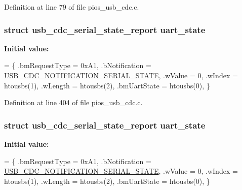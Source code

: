 Definition at line 79 of file pios\-\_\-usb\-\_\-cdc.\-c.

\hypertarget{group___p_i_o_s___u_s_b___c_o_m_gaf7f356f1ada9744b2424b2980baa2a81}{
\subsubsection[{uart\-\_\-state}]{\setlength{\rightskip}{0pt plus 5cm}struct {\bf usb\-\_\-cdc\-\_\-serial\-\_\-state\-\_\-report} uart\-\_\-state}}\label{group___p_i_o_s___u_s_b___c_o_m_gaf7f356f1ada9744b2424b2980baa2a81}
{\bfseries Initial value\-:}
\begin{DoxyCode}
= \{
        .bmRequestType = 0xA1,
        .bNotification = \hyperlink{group___p_i_o_s___u_s_b___d_e_f_s_gaf403cb181cb362069801308d723a0b53}{USB\_CDC\_NOTIFICATION\_SERIAL\_STATE},
        .wValue        = 0,
        .wIndex        = htousbs(1),
        .wLength       = htousbs(2),
        .bmUartState  = htousbs(0),
\}
\end{DoxyCode}


Definition at line 404 of file pios\-\_\-usb\-\_\-cdc.\-c.

\hypertarget{group___p_i_o_s___u_s_b___c_o_m_gaf7f356f1ada9744b2424b2980baa2a81}{
\subsubsection[{uart\-\_\-state}]{\setlength{\rightskip}{0pt plus 5cm}struct {\bf usb\-\_\-cdc\-\_\-serial\-\_\-state\-\_\-report} uart\-\_\-state}}\label{group___p_i_o_s___u_s_b___c_o_m_gaf7f356f1ada9744b2424b2980baa2a81}
{\bfseries Initial value\-:}
\begin{DoxyCode}
= \{
        .bmRequestType = 0xA1,
        .bNotification = \hyperlink{group___p_i_o_s___u_s_b___d_e_f_s_gaf403cb181cb362069801308d723a0b53}{USB\_CDC\_NOTIFICATION\_SERIAL\_STATE},
        .wValue        = 0,
        .wIndex        = htousbs(1),
        .wLength       = htousbs(2),
        .bmUartState   = htousbs(0),
\}
\end{DoxyCode}


